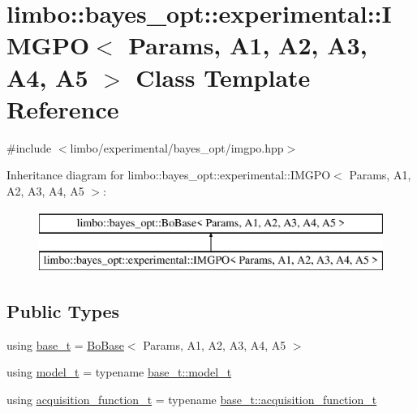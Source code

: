 \hypertarget{classlimbo_1_1bayes__opt_1_1experimental_1_1_i_m_g_p_o}{}\section{limbo\+:\+:bayes\+\_\+opt\+:\+:experimental\+:\+:I\+M\+G\+P\+O$<$ Params, A1, A2, A3, A4, A5 $>$ Class Template Reference}
\label{classlimbo_1_1bayes__opt_1_1experimental_1_1_i_m_g_p_o}


{\ttfamily \#include $<$limbo/experimental/bayes\+\_\+opt/imgpo.\+hpp$>$}

Inheritance diagram for limbo\+:\+:bayes\+\_\+opt\+:\+:experimental\+:\+:I\+M\+G\+P\+O$<$ Params, A1, A2, A3, A4, A5 $>$\+:\begin{figure}[H]
\begin{center}
\leavevmode
\includegraphics[height=2.000000cm]{classlimbo_1_1bayes__opt_1_1experimental_1_1_i_m_g_p_o}
\end{center}
\end{figure}
\subsection*{Public Types}
\begin{DoxyCompactItemize}
\item 
using \hyperlink{classlimbo_1_1bayes__opt_1_1experimental_1_1_i_m_g_p_o_a503aab1180ed196b4cdb35befa9b741e}{base\+\_\+t} = \hyperlink{classlimbo_1_1bayes__opt_1_1_bo_base}{Bo\+Base}$<$ Params, A1, A2, A3, A4, A5 $>$
\item 
using \hyperlink{classlimbo_1_1bayes__opt_1_1experimental_1_1_i_m_g_p_o_ae1e0602bec9e133b40e2c171fca8d8de}{model\+\_\+t} = typename \hyperlink{classlimbo_1_1bayes__opt_1_1_bo_base_a5e23d523dd2a16b866a2660721b937bb}{base\+\_\+t\+::model\+\_\+t}
\item 
using \hyperlink{classlimbo_1_1bayes__opt_1_1experimental_1_1_i_m_g_p_o_a794770d90f1ddd8efde68bad804ee5e7}{acquisition\+\_\+function\+\_\+t} = typename \hyperlink{classlimbo_1_1bayes__opt_1_1_bo_base_a5abe502b49e1ee70d5e00f27f95f5dff}{base\+\_\+t\+::acquisition\+\_\+function\+\_\+t}
\end{DoxyCompactItemize}
